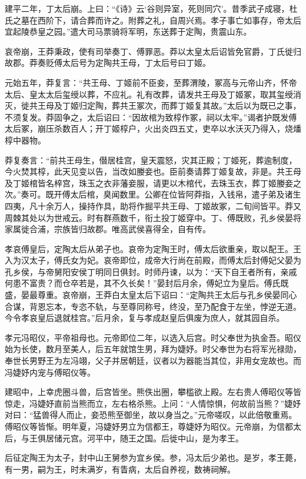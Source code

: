 \documentclass[]{article}
\begin{document}
建平二年，丁太后崩。上曰：``《诗》云`谷则异室，死则同穴'。昔季武子成寝，杜氏之墓在西阶下，请合葬而许之。附葬之礼，自周兴焉。孝子事亡如事存，帝太后宜起陵恭皇之园。''遣大司马票骑将军明，东送葬于定陶，贵震山东。

哀帝崩，王莽秉政，使有司举奏丁、傅罪恶。莽以太皇太后诏皆免官爵，丁氏徙归故郡。莽奏贬傅太后号为定陶共王母，丁太后号曰丁姬。

元始五年，莽复言：``共王母、丁姬前不臣妾，至葬渭陵，冢高与元帝山齐，怀帝太后、皇太太后玺绶以葬，不应礼。礼有改葬，请发共王母及丁姬冢，取其玺绶消灭，徙共王母及丁姬归定陶，葬共王冢次，而葬丁姬复其故。''太后以为既已之事，不须复发。莽固争之，太后诏曰：``因故棺为致椁作冢，祠以太牢。''谒者护既发傅太后冢，崩压杀数百人；开丁姬椁户，火出炎四五丈，吏卒以水沃灭乃得入，烧燔椁中器物。

莽复奏言：``前共王母生，僣居桂宫，皇天震怒，灾其正殿；丁姬死，葬逾制度，今火焚其椁，此天见变以告，当改如媵妾也。臣前奏请葬丁姬复故，非是。共王母及丁姬棺皆名梓宫，珠玉之衣非藩妾服，请更以木棺代，去珠玉衣，葬丁姬媵妾之次。''奏可。既开傅太后棺，臭闻数里。公卿在位皆阿莽指，入钱帛，遣子弟及诸生四夷，凡十余万人，操持作具，助将作掘平共王母、丁姬故冢，二旬间皆平。莽又周棘其处以为世戒云。时有群燕数千，衔土投丁姬穿中。丁、傅既败，孔乡侯晏将家属徙合浦，宗族皆归故郡。唯高武侯喜得全，自有传。

孝哀傅皇后，定陶太后从弟子也。哀帝为定陶王时，傅太后欲重亲，取以配王。王入为汉太子，傅氏女为妃。哀帝即位，成帝大行尚在前殿，而傅太后封傅妃父晏为孔乡侯，与帝舅阳安侯丁明同日俱封。时师丹谏，以为：``天下自王者所有，亲戚何患不富贵？而仓卒若是，其不久长矣！''晏封后月余，傅妃立为皇后。傅氏既盛，晏最尊重。哀帝崩，王莽白太皇太后下诏曰：``定陶共王太后与孔乡侯晏同心合谋，背恩忘本，专恣不轨，与至尊同称号，终没，至乃配食于左坐，悖逆无道。今令孝哀皇后退就桂宫。''后月余，复与孝成赵皇后俱废为庶人，就其园自杀。

孝元冯昭仪，平帝祖母也。元帝即位二年，以选入后宫。时父奉世为执金吾。昭仪始为长使，数月至美人，后五年就馆生男，拜为婕妤。时父奉世为右将军光禄勋，奉世长男野王为左冯翊，父子并居朝廷，议者以为器能当其位，非用女宠故也。而冯婕妤内宠与傅昭仪等。

建昭中，上幸虎圈斗兽，后宫皆坐。熊佚出圈，攀槛欲上殿。左右贵人傅昭仪等皆惊走，冯婕妤直前当熊而立，左右格杀熊。上问：``人情惊惧，何故前当熊？''婕妤对曰：``猛兽得人而止，妾恐熊至御坐，故以身当之。''元帝嗟叹，以此倍敬重焉。傅昭仪等皆惭。明年夏，冯婕妤男立为信都王，尊婕妤为昭仪。元帝崩，为信都太后，与王俱居储元宫。河平中，随王之国。后徙中山，是为孝王。

后征定陶王为太子，封中山王舅参为宜乡侯。参，冯太后少弟也。是岁，孝王薨，有一男，嗣为王，时未满岁，有眚病，太后自养视，数祷祠解。
\end{document}
